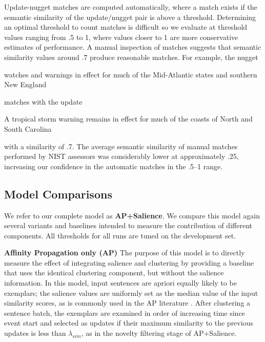 Update-nugget matches are computed automatically, where a
match exists if the semantic similarity of the update/nugget pair is above 
a threshold.
Determining an optimal threshold to count matches is difficult so 
we evaluate at 
threshold values ranging
from .5 to 1, where values closer to 1 are more conservative estimates of
performance.
A manual inspection of matches 
suggests that semantic similarity values around .7 produce reasonable matches.
For example, the nugget 
\begin{blockquote}
watches and warnings in effect for much of the Mid-Atlantic states and 
southern New England 
\end{blockquote}
\noindent
matches with the update 
\begin{blockquote}
A tropical storm warning remains in effect for much of the coasts 
of North and South Carolina\end{blockquote}
\noindent
with a similarity of .7. 
The average semantic similarity of manual matches performed 
by NIST assessors was considerably lower at approximately .25, increasing
our confidence in the automatic matches in the .5--1 range.


\subsection{Model Comparisons}
We refer to our complete model as \textbf{AP+Salience}.  We compare this model again several variants and baselines intended to measure the contribution of different components. All thresholds
for all runs are tuned on the development set.

\textbf{Affinity Propagation only (AP) } The purpose of this model
is to directly measure the effect of integrating salience and clustering by providing a baseline that uses the identical 
clustering component, but without the salience information.
In this model, input sentences are apriori equally likely to be exemplars;
the salience values are uniformly set as the median value of the 
input similarity scores, as is commonly used in the AP literature \cite{?}.
After clustering a sentence batch, the exemplars are examined in order
of increasing time since event start and selected as updates if their
maximum similarity to the previous updates is less than $\lambda_{sim}$,
as in the novelty filtering stage of AP+Salience.

